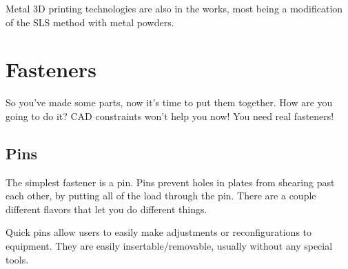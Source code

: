 \documentclass[10pt,letterpaper]{book}
\begin{document}
 	Metal 3D printing technologies are also in the works, most being a modification of the SLS method with metal powders.
 		
	\section{Fasteners}
	So you've made some parts, now it's time to put them together. How are you going to do it? CAD constraints won't help you now! You need real fasteners!
	
	\subsection{Pins}
	The simplest fastener is a pin. Pins prevent holes in plates from shearing past each other, by putting all of the load through the pin. There are a couple different flavors that let you do different things.
	
	Quick pins allow users to easily make adjustments or reconfigurations to equipment. They are easily insertable/removable, usually without any special tools.
	
\end{document}

